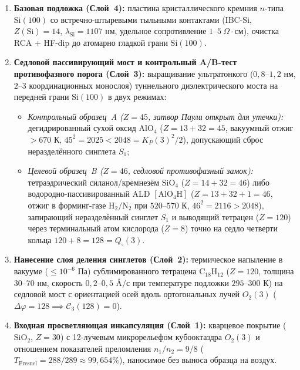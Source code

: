 \begin{enumerate}[label=\textbf{Шаг~\arabic*.},leftmargin=*]
\item \textbf{Базовая подложка (Слой~4):} пластина кристаллического кремния $n$-типа $\mathrm{Si}(100)$ со встречно-штыревыми тыльными контактами (IBC-$\mathrm{Si}$, $Z(\mathrm{Si})=14$, $\lambda_{\mathrm{Si}} = 1107\text{ нм}$, удельное сопротивление $1\text{--}5\ \Omega\cdot\text{см}$), очистка RCA + HF-dip до атомарно гладкой грани $\mathrm{Si}(100)$.
\item \textbf{Седловой пассивирующий мост и контрольный A/B-тест противофазного порога (Слой~3):} выращивание ультратонкого ($0{,}8\text{--}1{,}2\text{ нм}$, $2\text{--}3$ координационных монослоя) туннельного диэлектрического моста на передней грани $\mathrm{Si}(100)$ в двух режимах:
  \begin{itemize}[noitemsep]
  \item \emph{Контрольный образец~A ($Z = 45$, затвор Паули открыт для утечки):} дегидрированный сухой оксид $\mathrm{AlO_4}$ ($Z = 13 + 32 = 45$, вакуумный отжиг $> 670\text{ К}$, $45^2 = 2025 < 2048 = K_P(3)^2/2$), допускающий сброс неразделённого синглета $S_1$;
  \item \emph{Целевой образец~B ($Z = 46$, седловой противофазный замок):} тетраэдрический силанол/кремнезём $\mathrm{SiO_4}$ ($Z = 14 + 32 = 46$) либо водородно-пассивированный ALD $[\mathrm{AlO_4H}]$ ($Z = 13 + 32 + 1 = 46$, отжиг в форминг-газе $\mathrm{H_2}/\mathrm{N_2}$ при $520\text{--}570\text{ К}$, $46^2 = 2116 > 2048$), запирающий неразделённый синглет $S_1$ и выводящий тетрацен ($Z=120$) через терминальный атом кислорода ($Z=8$) точно на седло четверти кольца $120 + 8 = 128 = Q_\square(3)$.
  \end{itemize}
\item \textbf{Нанесение слоя деления синглетов (Слой~2):} термическое напыление в вакууме ($\le 10^{-6}\text{ Па}$) сублимированного тетрацена $\mathrm{C_{18}H_{12}}$ ($Z = 120$, толщина $30\text{--}70\text{ нм}$, скорость $0{,}2\text{--}0{,}5\text{ \AA/с}$ при температуре подложки $295\text{--}300\text{ К}$) на седловой мост с ориентацией осей вдоль ортогональных лучей $O_2(3)$ ($\Delta\varphi = 128 \implies \mathcal{C}_3(128) = 0$).
\item \textbf{Входная просветляющая инкапсуляция (Слой~1):} кварцевое покрытие ($\mathrm{SiO_2}$, $Z = 30$) с 12-лучевым микрорельефом кубооктаэдра $O_2(3)$ и отношением показателей преломления $n_1/n_2 = 9/8$ ($T_{\mathrm{Fresnel}} = 288/289 \approx 99{,}654\%$), наносимое без выноса образца на воздух.
\end{enumerate}

